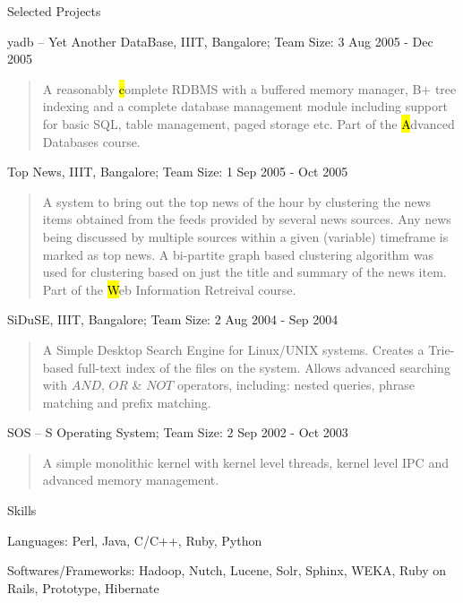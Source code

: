 \documentclass{resume}
\newcommand{\teamsize}{\sc\footnotesize Team Size: }
\begin{document}
\begin{category}{Selected Projects}{}
    \item {\topic yadb -- Yet Another DataBase,} IIIT, Bangalore;
        {\teamsize 3}
        {\period Aug 2005 - Dec 2005}
        \begin{quote}
            A reasonably {\hl complete RDBMS} with a buffered memory manager, B+
            tree indexing and a complete database management module including
            support for basic SQL, table management, paged storage etc. Part of the
            {\hl Advanced Databases} course.
        \end{quote}

    \item {\topic Top News,} IIIT, Bangalore;
        {\teamsize 1}
        {\period Sep 2005 - Oct 2005}
        \begin{quote}
            A system to bring out the top news of the hour by clustering the news
            items obtained from the feeds provided by several news sources. Any
            news being discussed by multiple sources within a given (variable)
            timeframe is marked as top news. A bi-partite graph based clustering
            algorithm was used for clustering based on just the title and summary
            of the news item. Part of the {\hl Web Information Retreival} course.
        \end{quote}

    \item {\topic SiDuSE,} IIIT, Bangalore;
        {\teamsize 2}
        {\period Aug 2004 - Sep 2004}
        \begin{quote}
            A Simple Desktop Search Engine for Linux/UNIX systems. Creates a
            Trie-based full-text index of the files on the system. Allows advanced
            searching with $AND$, $OR$ \& $NOT$ operators, including: nested
            queries, phrase matching and prefix matching.
        \end{quote}

    \item {\topic SOS -- S Operating System;}
        {\teamsize 2}
        {\period Sep 2002 - Oct 2003}
        \begin{quote}
            A simple monolithic kernel with kernel level threads, kernel level IPC and advanced memory management.
        \end{quote}

\end{category}


\begin{category}{Skills}{}

    \item {\topic Languages:} Perl, Java, C/C++, Ruby, Python

    \item {\topic Softwares/Frameworks:} Hadoop, Nutch, Lucene, Solr, Sphinx, WEKA,
    Ruby on Rails, Prototype, Hibernate

\end{category}
\end{document}
